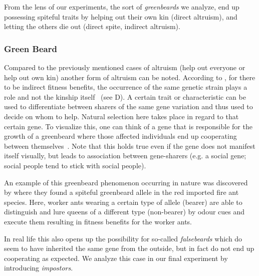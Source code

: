 \documentclass[sigconf]{acmart}
\newcommand{\impostors}{\textit{impostors}\xspace}
\newcommand{\greenbeards}{\textit{greenbeards}\xspace}
\begin{document}
    From the lens of our experiments, the sort of \greenbeards we analyze, end up possessing spiteful traits by helping out their own kin (direct altruism), and letting the others die out (direct spite, indirect altruism).

    \subsubsection{Green Beard}
    Compared to the previously mentioned cases of altruism (help out everyone or help out own kin) another form of altruism can be noted.
    According to \citeauthor{hamiltonInnateSocialAptitudes1975}, for there to be indirect fitness benefits, the occurrence of the same genetic strain plays a role and not the kinship itself~\cite{hamiltonInnateSocialAptitudes1975} (see  D).
    A certain trait or characteristic can be used to differentiate between sharers of the same gene variation and thus used to decide on whom to help.
    Natural selection here takes place in regard to that certain gene.
    To visualize this, one can think of a gene that is responsible for the growth of a greenbeard where those affected individuals end up cooperating between themselves~\cite{SelfishGeneRichard}.
    Note that this holds true even if the gene does not manifest itself visually, but leads to association between gene-sharers (e.g. a social gene; social people tend to stick with social people).

    An example of this greenbeard phenomenon occurring in nature was discovered by \citeauthor{keller_selfish_1998} \cite{keller_selfish_1998} where they found a spiteful greenbeard allele in the red imported fire ant species.
    Here, worker ants wearing a certain type of allele (bearer) are able to distinguish and lure queens of a different type (non-bearer) by odour cues and execute them resulting in fitness benefits for the worker ants.

    In real life this also opens up the possibility for so-called \textit{falsebeards} which do seem to have inherited the same gene from the outside, but in fact do not end up cooperating as expected.
    We analyze this case in our final experiment by introducing \impostors.
\end{document}
